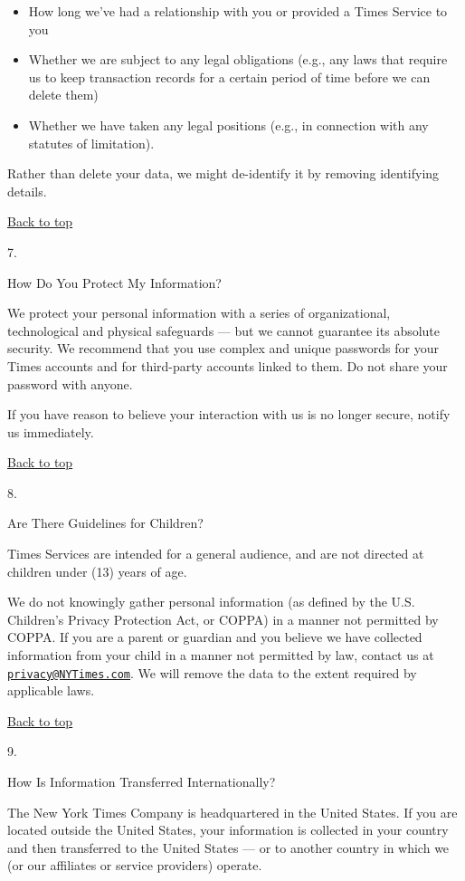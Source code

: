 \begin{itemize}
\tightlist
\item
  How long we've had a relationship with you or provided a Times Service
  to you
\item
  Whether we are subject to any legal obligations (e.g., any laws that
  require us to keep transaction records for a certain period of time
  before we can delete them)
\item
  Whether we have taken any legal positions (e.g., in connection with
  any statutes of limitation).
\end{itemize}

Rather than delete your data, we might de-identify it by removing
identifying details.

\href{app}{Back to top}

7.

How Do You Protect My Information?

We protect your personal information with a series of organizational,
technological and physical safeguards --- but we cannot guarantee its
absolute security. We recommend that you use complex and unique
passwords for your Times accounts and for third-party accounts linked to
them. Do not share your password with anyone.

If you have reason to believe your interaction with us is no longer
secure, notify us immediately.

\href{app}{Back to top}

8.

Are There Guidelines for Children?

Times Services are intended for a general audience, and are not directed
at children under (13) years of age.

We do not knowingly gather personal information (as defined by the U.S.
Children's Privacy Protection Act, or COPPA) in a manner not permitted
by COPPA. If you are a parent or guardian and you believe we have
collected information from your child in a manner not permitted by law,
contact us at
\href{mailto:privacy@NYTimes.com}{\nolinkurl{privacy@NYTimes.com}}. We
will remove the data to the extent required by applicable laws.

\href{app}{Back to top}

9.

How Is Information Transferred Internationally?

The New York Times Company is headquartered in the United States. If you
are located outside the United States, your information is collected in
your country and then transferred to the United States --- or to another
country in which we (or our affiliates or service providers) operate.

